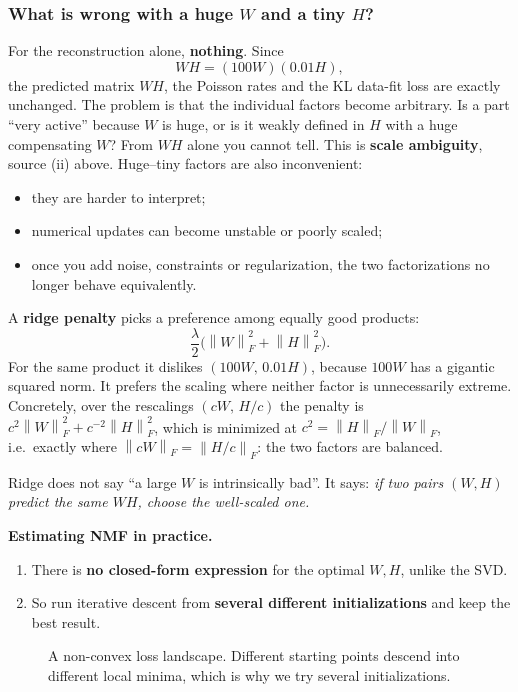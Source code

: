 \documentclass[11pt]{article}
\newcommand{\Fro}[1]{\left\lVert #1\right\rVert_F}
\begin{document}
\subsubsection*{What is wrong with a huge $W$ and a tiny $H$?}

For the reconstruction alone, \textbf{nothing}. Since
\[
WH=(100W)(0.01H),
\]
the predicted matrix $WH$, the Poisson rates and the KL data-fit loss are exactly unchanged. The
problem is that the individual factors become arbitrary. Is a part ``very active'' because $W$ is
huge, or is it weakly defined in $H$ with a huge compensating $W$? From $WH$ alone you cannot
tell. This is \textbf{scale ambiguity}, source (ii) above. Huge--tiny factors are also inconvenient:
\begin{itemize}[nosep]
\item they are harder to interpret;
\item numerical updates can become unstable or poorly scaled;
\item once you add noise, constraints or regularization, the two factorizations no longer behave equivalently.
\end{itemize}

A \textbf{ridge penalty} picks a preference among equally good products:
\[
\frac{\lambda}{2}\Big(\Fro{W}^2+\Fro{H}^2\Big).
\]
For the same product it dislikes $(100W,\,0.01H)$, because $100W$ has a gigantic squared norm. It
prefers the scaling where neither factor is unnecessarily extreme. Concretely, over the rescalings
$(cW,\,H/c)$ the penalty is $c^2\Fro{W}^2+c^{-2}\Fro{H}^2$, which is minimized at
$c^2=\Fro{H}/\Fro{W}$, i.e.\ exactly where $\Fro{cW}=\Fro{H/c}$: the two factors are balanced.

\begin{intuition}
Ridge does not say ``a large $W$ is intrinsically bad''. It says: \emph{if two pairs $(W,H)$
predict the same $WH$, choose the well-scaled one.}
\end{intuition}

\textbf{Estimating NMF in practice.}
\begin{enumerate}[nosep]
\item There is \textbf{no closed-form expression} for the optimal $W,H$, unlike the SVD.
\item So run iterative descent from \textbf{several different initializations} and keep the best result.
\end{enumerate}

\begin{figure}[htbp]
\centering
{}
\caption{A non-convex loss landscape. Different starting points descend into different
local minima, which is why we try several initializations.}
\end{figure}
\end{document}
